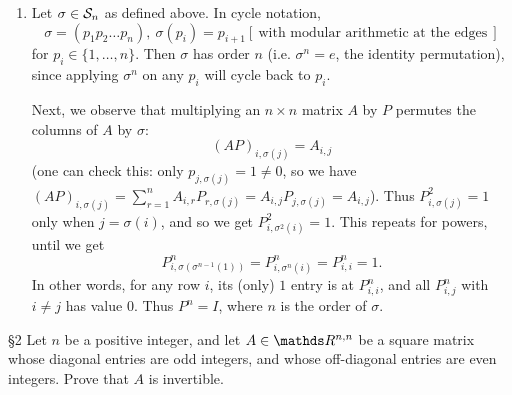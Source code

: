 \documentclass{homework}
\begin{document}
\begin{solution}
\begin{enumerate}[label=(\alph*)]
    \item Let $\sigma\in \mathcal{S}_n$ as defined above. In cycle notation, \[
        \sigma=\left( p_1p_2\ldots p_n \right) ,\ \sigma(p_i)=p_{i+1} [~\text{with modular
        arithmetic at the edges}~]
      \] for $p_i\in \{ 1,\ldots,n \}$. Then $\sigma$ has order $n$ (i.e. $\sigma^n=e$, the identity
      permutation), since applying $\sigma^n$ on any $p_i$ will cycle back to $p_i$.

      Next, we observe that multiplying an $n\times n$ matrix $A$ by $P$ permutes the columns of $A$
      by $\sigma$: \[
        (AP)_{i,\sigma(j)}=A_{i,j}
      \] (one can check this: only $p_{j,\sigma(j)}=1\neq 0$, so we have
      $(AP)_{i,\sigma(j)}=\sum_{r=1}^{n} A_{i,r}P_{r,\sigma(j)}=A_{i,j}P_{j,\sigma(j)}=A_{i,j}$).
      Thus $P^2_{i,\sigma(j)}=1$ only when $j=\sigma(i)$, and so we get $P^2_{i,\sigma^2(i)}=1$.
      This repeats for powers, until we get \[
        P^n_{i,\sigma(\sigma^{n-1}(1))}=P^n_{i,\sigma^n(i)}=P^n_{i,i}=1
      .\] In other words, for any row $i$, its (only) $1$ entry is at $P^n_{i,i}$, and all
      $P^n_{i,j}$ with $i\neq j$ has value $0$. Thus $P^n=I$, where $n$ is the order of $\sigma$.
  \end{enumerate}
\end{solution}

\begin{problem}{\S 2}
  Let $n$ be a positive integer, and let $A\in \R^{n,n}$ be a square matrix whose diagonal entries
  are odd integers, and whose off-diagonal entries are even integers. Prove that $A$ is invertible.
\end{problem}
\end{document}
